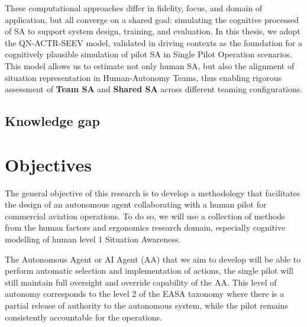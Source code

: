 \documentclass[12pt,a4paper]{article} %
\begin{document}
	These computational approaches differ in fidelity, focus, and domain of application, but all converge on a shared goal: simulating the cognitive processed of SA to support system design, training, and evaluation. In this thesis, we adopt the QN-ACTR-SEEV model, validated in driving contexts as the foundation for a cognitively plausible simulation of pilot SA in Single Pilot Operation scenarios. This model allows us to estimate not only human SA, but also the alignment of situation representation in Human-Autonomy Teams, thus enabling rigorous assessment of \textbf{Team SA} and \textbf{Shared SA} across different teaming configurations.

	\subsection{Knowledge gap} %
	
	
	\section{Objectives} %
	The general objective of this research is to develop a methodology that facilitates the design of an autonomous agent collaborating with a human pilot for commercial aviation operations. To do so, we will use a collection of methods from the human factors and ergonomics research domain, especially cognitive modelling of human level 1 Situation Awareness.

	The Autonomous Agent or AI Agent (AA) that we aim to develop will be able to perform automatic selection and implementation of actions, the single pilot will still maintain full oversight and override capability of the AA. This level of autonomy corresponds to the level 2 of the EASA taxonomy where there is a partial release of authority to the autonomous system, while the pilot remains consistently accountable for the operations.
\end{document}
